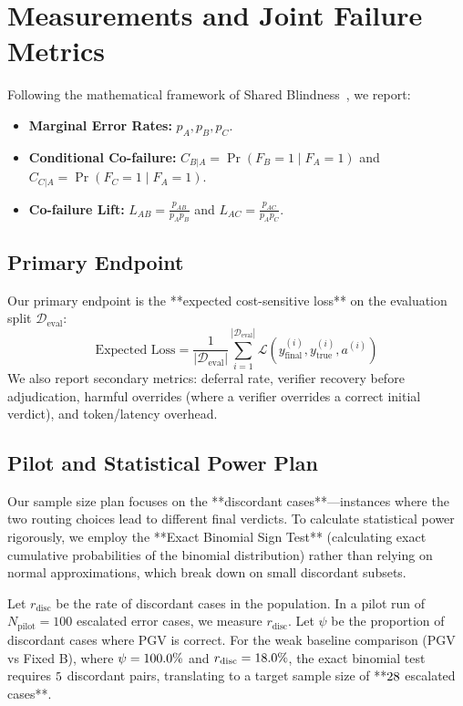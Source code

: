 \documentclass[manuscript,screen,nonacm]{acmart}
\begin{document}
\section{Measurements and Joint Failure Metrics}
\label{sec:metrics}

Following the mathematical framework of Shared Blindness~\cite{paul2026shared}, we report:
\begin{itemize}
    \item \textbf{Marginal Error Rates:} $p_A, p_B, p_C$.
    \item \textbf{Conditional Co-failure:} $C_{B|A} = \Pr(F_B=1 \mid F_A=1)$ and $C_{C|A} = \Pr(F_C=1 \mid F_A=1)$.
    \item \textbf{Co-failure Lift:} $L_{AB} = \frac{p_{AB}}{p_A p_B}$ and $L_{AC} = \frac{p_{AC}}{p_A p_C}$.
\end{itemize}

\subsection{Primary Endpoint}
Our primary endpoint is the **expected cost-sensitive loss** on the evaluation split $\mathcal{D}_{\text{eval}}$:
\begin{equation}
    \text{Expected Loss} = \frac{1}{|\mathcal{D}_{\text{eval}}|} \sum_{i=1}^{|\mathcal{D}_{\text{eval}}|} \mathcal{L}(y_{\text{final}}^{(i)}, y_{\text{true}}^{(i)}, a^{(i)})
\end{equation}
We also report secondary metrics: deferral rate, verifier recovery before adjudication, harmful overrides (where a verifier overrides a correct initial verdict), and token/latency overhead.

\subsection{Pilot and Statistical Power Plan}
Our sample size plan focuses on the **discordant cases**—instances where the two routing choices lead to different final verdicts. To calculate statistical power rigorously, we employ the **Exact Binomial Sign Test** (calculating exact cumulative probabilities of the binomial distribution) rather than relying on normal approximations, which break down on small discordant subsets.

Let $r_{\text{disc}}$ be the rate of discordant cases in the population. In a pilot run of $N_{\text{pilot}} = 100$ escalated error cases, we measure $r_{\text{disc}}$. Let $\psi$ be the proportion of discordant cases where PGV is correct. For the weak baseline comparison (PGV vs Fixed B), where $\psi = 100.0\%$ and $r_{\text{disc}} = 18.0\%$, the exact binomial test requires $5$ discordant pairs, translating to a target sample size of **$28$ escalated cases**.
\end{document}
